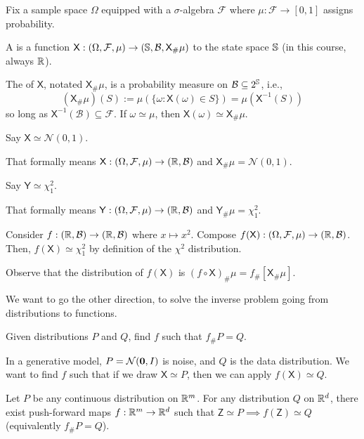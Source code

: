 \documentclass[notes]{agony}
\newcommand{\rv}{\mathsf}
\renewcommand{\N}{\mathcal{N}}
\newcommand{\stdspace}{(\Omega, \mathcal{F}, \mu)}
\begin{document}
\begin{defn}
	Fix a sample space $\Omega$ equipped with a $\sigma$-algebra $\mathcal{F}$
	where $\mu : \mathcal{F} \to [0,1]$ assigns probability.

	A  is a function $\rv X : \stdspace \to (\bb S, \mathcal{B}, \rv X_\#\mu)$
	to the state space $\mathbb S$ (in this course, always $\mathbb{R}$).

	The  of $\rv X$, notated $\rv X_\#\mu$,
	is a probability measure on $\mathcal{B} \subseteq 2^{\mathbb S}$, i.e.,
	\[ (\rv X_\#\mu)(S) := \mu(\{\omega : \rv X(\omega) \in S\}) = \mu(\rv X^{-1}(S)) \]
	so long as $\rv X^{-1}(\mathcal B) \subseteq \mathcal F$.
	If $\omega \simeq \mu$, then $\rv X(\omega) \simeq \rv X_\#\mu$.
\end{defn}
\begin{example}
	Say $\rv X \simeq \N(0,1)$.

	That formally means
	$\rv X : \stdspace \to (\R, \mathcal{B})$ and $\rv X_\#\mu = \N(0,1)$.
\end{example}
\begin{example}
	Say $\rv Y \simeq \chi^2_1$.

	That formally means
	$\rv Y : \stdspace \to (\R, \mathcal{B})$ and $\rv Y_\#\mu = \chi^2_1$.
\end{example}

Consider $f : (\mathbb{R},\mathcal{B}) \to (\mathbb{R},\mathcal{B})$ where $x \mapsto x^2$.
Compose $f(\rv X) : \stdspace \to (\R,\mathcal{B})$.
Then, $f(\rv X) \simeq \chi^2_1$ by definition of the $\chi^2$ distribution.

Observe that the distribution of $f(\rv X)$ is $(f\circ \rv X)_\#\mu = f_\#[\rv X_\# \mu]$.

We want to go the other direction, to solve the inverse problem going from
distributions to functions.

\begin{problem}
	Given distributions $P$ and $Q$, find $f$ such that $f_\#P = Q$.
\end{problem}

In a generative model, $P = \N(\vb 0,I)$ is noise, and $Q$ is the data distribution.
We want to find $f$ such that if we draw $\rv X \simeq P$, then we can apply
$f(\rv X) \simeq Q$.

\begin{theorem}
	Let $P$ be any continuous distribution on $\mathbb{R}^m$.
	For any distribution $Q$ on $\mathbb{R}^d$, there exist push-forward maps
	$f : \mathbb{R}^m \to \mathbb{R}^d$ such that $\rv Z \simeq P \implies f(\rv Z) \simeq Q$
	(equivalently $f_\#P = Q$).
\end{theorem}
\end{document}
